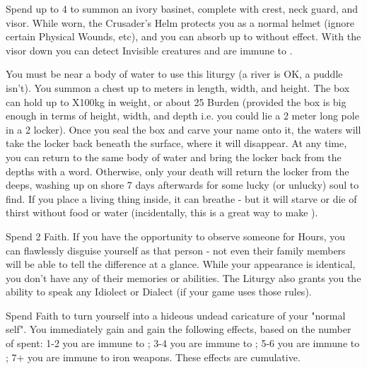 \begin{multicols*}{2}

\newpage

\LITURGY [
  Name = Crusader's Helm,
  Link = arcana-mystery-crusaders-helm,
  Paradigm = Righteous
]


Spend up to 4 \DICE to summon an ivory basinet, complete with crest, neck guard, and visor.  While worn, the Crusader's Helm protects you as a normal helmet (ignore certain Physical Wounds, etc), and you can absorb up to \DICE {} without effect.  With the visor down you can detect Invisible creatures and are immune to . 

\LITURGY [
  Name = Davy Jones's Locker,
  Link = arcana-mystery-davy-joness-locker,
  Paradigm = Cthonic
]

You must be near a body of water to use this liturgy (a river is OK, a puddle isn't).  You summon a chest up to \DICE meters in length, width, and height.  The box can hold up to \DICE X100kg in weight, or about 25 Burden (provided the box is big enough in terms of height, width, and depth i.e. you could lie a 2 meter long pole in a 2 \DICE locker).  Once you seal the box and carve your name onto it, the waters will take the locker back beneath the surface, where it will disappear.  At any time, you can return to the same body of water and bring the locker back from the depths with a word. Otherwise, only your death will return the locker from the deeps, washing up on shore 7 days afterwards for some lucky (or unlucky) soul to find. If you place a living thing inside, it can breathe - but it will starve or die of thirst without food or water (incidentally, this is a great way to make ).

\LITURGY [
  Name = Doppelg{\UmlautA}nger,
  Link = arcana-mystery-doppelganger,
  Paradigm = Cunning
]

Spend 2 Faith. If you have the opportunity to observe someone for Hours, you can flawlessly disguise yourself as that person - not even their family members will be able to tell the difference at a glance.  While your appearance is identical, you don't have any of their memories or abilities. The Liturgy also grants you the ability to speak any Idiolect or Dialect (if your game uses those rules).

\LITURGY [
  Name = Gory Locks,
  Link = arcana-mystery-gory-locks,
  Paradigm = Monstrous
]

Spend \DICE Faith to turn yourself into a hideous undead caricature of your "normal self".  You immediately gain  and gain the following effects, based on the number of \DICE spent:  1-2 you are immune to ; 3-4 you are immune to ; 5-6 you are immune to ; 7+  you are immune to iron weapons.  These effects are cumulative.


\end{multicols*}
